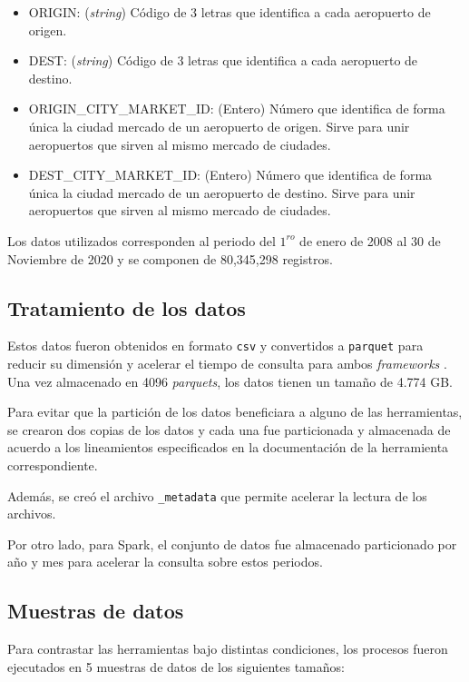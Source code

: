 \begin{itemize}
	\item ORIGIN: (\textit{string}) Código de 3 letras que identifica a cada aeropuerto de origen.
	\item DEST: (\textit{string}) Código de 3 letras que identifica a cada aeropuerto de destino.
	\item ORIGIN\_CITY\_MARKET\_ID: (Entero) Número que identifica de forma única la ciudad mercado de un aeropuerto de origen. Sirve para unir aeropuertos que sirven al mismo mercado de ciudades.
	\item DEST\_CITY\_MARKET\_ID: (Entero) Número que identifica de forma única la ciudad mercado de un aeropuerto de destino. Sirve para unir aeropuertos que sirven al mismo mercado de ciudades.
\end{itemize}

Los datos utilizados corresponden al periodo del $1^{ro}$ de enero de 2008 al 30 de Noviembre de 2020 y se componen de 80,345,298 registros.

\subsection{Tratamiento de los datos}

Estos datos fueron obtenidos en formato \texttt{csv} y convertidos a \texttt{parquet} para reducir su dimensión y acelerar el tiempo de consulta para ambos \textit{frameworks} . Una vez almacenado en 4096 \textit{parquets}, los datos tienen un tamaño de 4.774 GB.

Para evitar que la partición de los datos beneficiara a alguno de las herramientas, se crearon dos copias de los datos y cada una fue particionada y almacenada de acuerdo a los lineamientos especificados en la documentación de la herramienta correspondiente.

Además, se creó el archivo \texttt{\_metadata} que permite acelerar la lectura de los archivos.

Por otro lado, para Spark, el conjunto de datos fue almacenado particionado por año y mes para acelerar la consulta sobre estos periodos.

\subsection{Muestras de datos}

Para contrastar las herramientas bajo distintas condiciones, los procesos fueron ejecutados en 5 muestras de datos de los siguientes tamaños:\\

